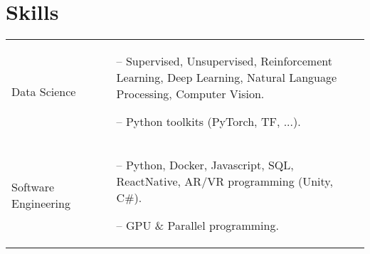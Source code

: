 \documentclass[a4paper,12pt]{article}
\begin{document}
\section{Skills}
\begin{tabularx}{\linewidth}{@{}l X@{}}
Data Science &  \small{
\begin{minipage}[t]{\linewidth}
    \begin{itemize}[nosep,after=\strut, leftmargin=1em, itemsep=1pt]
    \item[--]Supervised, Unsupervised, Reinforcement Learning, Deep Learning, Natural Language Processing, Computer Vision.
    \item[--]Python toolkits (PyTorch, TF, ...). 
    \end{itemize}
    \end{minipage}}
\\
Software Engineering  &  \small{
\begin{minipage}[t]{\linewidth}
    \begin{itemize}[nosep,after=\strut, leftmargin=1em, itemsep=1pt]
    \item[--]Python, Docker, Javascript, SQL, ReactNative, AR/VR programming (Unity, C\#).
    \item[--] GPU \& Parallel programming.
    \end{itemize}
    \end{minipage}}
\end{tabularx}
%
%
\end{document}
